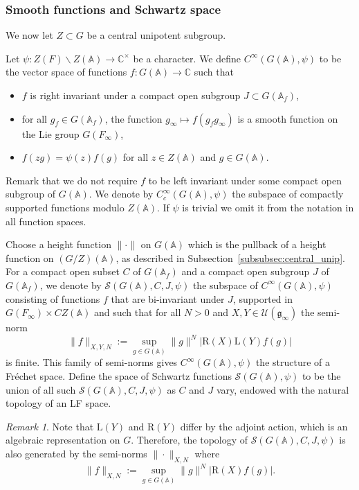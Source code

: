 \documentclass[letterpaper,11pt]{amsart}
\newcommand{\fg}{\mathfrak{g}}
\newcommand{\bA}{\mathbb{A}}
\newcommand{\C}{\mathbb{C}}
\newcommand{\cS}{\mathcal{S}}
\newcommand{\cU}{\mathcal{U}}
\newcommand{\<}{\negthickspace}
\providecommand{\abs}[1]{\lvert#1\rvert}
\providecommand{\aabs}[1]{\lVert#1\rVert}
\theoremstyle{definition}
\theoremstyle{plain}
\theoremstyle{remark}
\newtheorem{remark}[definition]{Remark}
\numberwithin{equation}{section}
\begin{document}
\subsubsection{Smooth functions and Schwartz space}

We now let $Z \subset G$ be a
central unipotent subgroup.

Let $\psi:Z(F) \backslash Z(\bA) \to \C^\times$ be a character. We define
$C^\infty(G(\bA),\psi)$ to be the vector space of functions $f:G(\bA) \to \C$ such
that
\begin{itemize}
    \item $f$ is right invariant under a compact open subgroup $J \subset G(\bA_{f})$,
    \item for all $g_f \in G(\bA_f)$, the function $g_\infty \mapsto f(g_fg_\infty)$ is a smooth function on the Lie group $G(F_\infty)$,
    \item $f(zg)=\psi(z)f(g)$ for all $z \in Z(\bA)$ and $g \in G(\bA)$.
\end{itemize}
Remark that we do not require
$f$ to be left invariant under some compact open subgroup of $G(\bA)$. We denote by $C_c^\infty(G(\bA),\psi)$ the subspace of compactly supported functions modulo $Z(\bA)$. If $\psi$ is trivial we omit it from the notation
in all function spaces.


Choose a height function $\aabs{\cdot}$ on $G(\bA)$ which is the pullback of a height function on $(G/Z)(\bA)$, as described in Subsection~\ref{subsubsec:central_unip}. For a compact open subset $C$ of $G(\bA_{f})$ and a
compact open subgroup $J$ of $G(\bA_{f})$, we denote by
$\cS(G(\bA),C,J,\psi)$ the subspace of $C^\infty(G(\bA), \psi)$ consisting
of functions $f$ that are bi-invariant under $J$, supported
in $G(F_\infty) \times CZ(\bA)$ and such that for all $N>0$ and $X,Y \in
\cU(\fg_\infty)$ the semi-norm
    \[
    \|f\|_{X,Y,N} := \sup_{g \in G(\bA)}  \aabs{g}^N
    \abs{\mathrm{R}(X)\mathrm{L}(Y)f(g)}
    \]
is finite. This family of semi-norms gives $C^\infty(G(\bA),\psi)$ the structure of a Fr\'{e}chet space. Define the space of Schwartz functions $\cS(G(\bA),\psi)$ to be the union
of all such $\cS(G(\bA),C,J,\psi)$ as $C$ and $J$ vary, endowed with the natural topology of an LF space.

\begin{remark} \label{rmk:Schwartz_space_equiv_norm}
    Note that $\mathrm{L}(Y)$ and $\mathrm{R}(Y)$ differ by the adjoint action, which is an algebraic representation on $G$. Therefore, the topology of $\cS(G(\bA),C,J,\psi)$ is also generated by the semi-norms $\| \cdot \|_{X,N}$ where
    \[
         \|f\|_{X,N} := \sup_{g \in G(\bA)}  \aabs{g}^N
    \abs{\mathrm{R}(X) f(g)} .
    \]
\end{remark}
\end{document}
